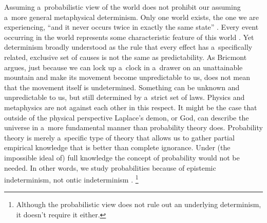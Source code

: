 Assuming a~probabilistic view of the world does not prohibit our assuming a~more general metaphysical determinism. Only one world exists, the one we are experiencing, ``and it never occurs twice in exactly the same state'' 
\parencite[][p.4]{bricmont_determinism_2002}. %
 Every event occurring in the world represents some characteristic feature of this world 
\parencite[][p.397]{fetzer_world_1977}. %
 Yet determinism broadly understood as the rule that every effect has a~specifically related, exclusive set of causes is not the same as predictability. As Bricmont argues, just because we can lock up a~clock in a~drawer on an unattainable mountain and make its movement become unpredictable to us, does not mean that the movement itself is undetermined. Something can be unknown and unpredictable to us, but still determined by a~strict set of laws. Physics and metaphysics are not against each other in this respect. It might be the case that outside of the physical perspective Laplace's demon, or God, can describe the universe in a~more fundamental manner than probability theory does. Probability theory is merely a~specific type of theory that allows us to gather partial empirical knowledge that is better than complete ignorance. Under (the impossible ideal of) full knowledge the concept of probability would not be needed. In other words, we study probabilities because of epistemic indeterminism, not ontic indeterminism 
\parencite[][pp.371–372]{fetzer_probability_1983}.%
\footnote{Although the probabilistic view does not rule out an underlying determinism, it doesn't require it either.}



